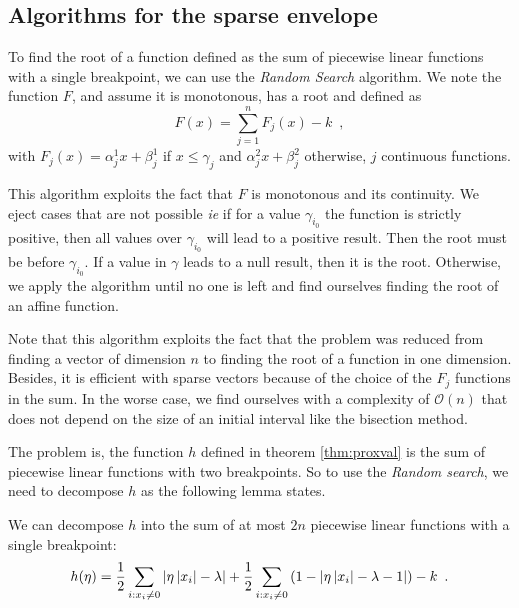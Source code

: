 
\subsection[Algorithm]{Algorithms for the sparse envelope}
To find the root of a function defined as the sum of piecewise linear functions with a single breakpoint, we can use the \textit{Random Search} algorithm. We note the function $F$, and assume it is monotonous, has a root and defined as \[F(x)=\sum_{j=1}^n F_j(x) - k\enspace,\] with $F_j(x)=\alpha^1_jx + \beta^1_j$ if $x\leq \gamma_j$ and $\alpha_j^2x+\beta_j^2$ otherwise, $j$ continuous functions.



This algorithm exploits the fact that $F$ is monotonous and its continuity. We eject cases that are not possible \textit{ie} if for a value $\gamma_{i_0}$ the function is strictly positive, then all values over $\gamma_{i_0}$ will lead to a positive result. Then the root must be before $\gamma_{i_0}$. If a value in $\gamma$ leads to a null result, then it is the root. Otherwise, we apply the algorithm until no one is left and find ourselves finding the root of an affine function.

\begin{remark}
Note that this algorithm exploits the fact that the problem was reduced from finding a vector of dimension $n$ to finding the root of a function in one dimension. Besides, it is efficient with sparse vectors because of the choice of the $F_j$ functions in the sum. In the worse case, we find ourselves with a complexity of $\mathcal{O}(n)$ that does not depend on the size of an initial interval like the bisection method.
\end{remark}

The problem is, the function $h$ defined in theorem \ref{thm:proxval} is the sum of piecewise linear functions with two breakpoints. So to use the \textit{Random search}, we need to decompose $h$ as the following lemma states.

\begin{lemma}
We can decompose $h$ into the sum of at most $2n$ piecewise linear functions with a single breakpoint:
\[h(\eta)=\frac{1}{2}\sum_{i:x_i\neq 0}\left|\eta\left|x_i\right|-\lambda\right| +\frac{1}{2}\sum_{i:x_i\neq 0}\left(1-\left|\eta \left|x_i\right| - \lambda - 1\right|\right) - k\enspace.\]
\end{lemma}


